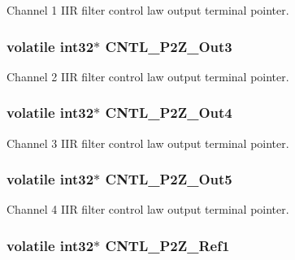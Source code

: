 Channel 1 I\-I\-R filter control law output terminal pointer. \hypertarget{a00009_a11dcb9f6b6d03fe960ddf790e1ad5ed2}{
\subsubsection[{C\-N\-T\-L\-\_\-2\-P2\-Z\-\_\-\-Out3}]{\setlength{\rightskip}{0pt plus 5cm}volatile int32$\ast$ C\-N\-T\-L\-\_\-P2\-Z\-\_\-\-Out3}}\label{a00009_a11dcb9f6b6d03fe960ddf790e1ad5ed2}
Channel 2 I\-I\-R filter control law output terminal pointer. \hypertarget{a00009_a253e4070b19470606e0566ff25fc911f}{
\subsubsection[{C\-N\-T\-L\-\_\-2\-P2\-Z\-\_\-\-Out4}]{\setlength{\rightskip}{0pt plus 5cm}volatile int32$\ast$ C\-N\-T\-L\-\_\-P2\-Z\-\_\-\-Out4}}\label{a00009_a253e4070b19470606e0566ff25fc911f}
Channel 3 I\-I\-R filter control law output terminal pointer. \hypertarget{a00009_a3b336a91d25a7feb9f8927b32b800d0d}{
\subsubsection[{C\-N\-T\-L\-\_\-2\-P2\-Z\-\_\-\-Out5}]{\setlength{\rightskip}{0pt plus 5cm}volatile int32$\ast$ C\-N\-T\-L\-\_\-P2\-Z\-\_\-\-Out5}}\label{a00009_a3b336a91d25a7feb9f8927b32b800d0d}
Channel 4 I\-I\-R filter control law output terminal pointer. \hypertarget{a00009_a98527ce76f5175fa2933d46f324d85fb}{
\subsubsection[{C\-N\-T\-L\-\_\-2\-P2\-Z\-\_\-\-Ref1}]{\setlength{\rightskip}{0pt plus 5cm}volatile int32$\ast$ C\-N\-T\-L\-\_\-P2\-Z\-\_\-\-Ref1}}\label{a00009_a98527ce76f5175fa2933d46f324d85fb}
